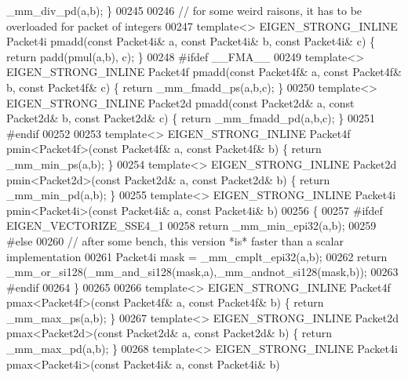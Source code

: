 \begin{DoxyCode}
      \_mm\_div\_pd(a,b); \}
00245 
00246 \textcolor{comment}{// for some weird raisons, it has to be overloaded for packet of integers}
00247 \textcolor{keyword}{template}<> EIGEN\_STRONG\_INLINE Packet4i pmadd(\textcolor{keyword}{const} Packet4i& a, \textcolor{keyword}{const} Packet4i& b, \textcolor{keyword}{const} Packet4i& c) \{ \textcolor{keywordflow}{
      return} padd(pmul(a,b), c); \}
00248 \textcolor{preprocessor}{#ifdef \_\_FMA\_\_}
00249 \textcolor{keyword}{template}<> EIGEN\_STRONG\_INLINE Packet4f pmadd(\textcolor{keyword}{const} Packet4f& a, \textcolor{keyword}{const} Packet4f& b, \textcolor{keyword}{const} Packet4f& c) \{ \textcolor{keywordflow}{
      return} \_mm\_fmadd\_ps(a,b,c); \}
00250 \textcolor{keyword}{template}<> EIGEN\_STRONG\_INLINE Packet2d pmadd(\textcolor{keyword}{const} Packet2d& a, \textcolor{keyword}{const} Packet2d& b, \textcolor{keyword}{const} Packet2d& c) \{ \textcolor{keywordflow}{
      return} \_mm\_fmadd\_pd(a,b,c); \}
00251 \textcolor{preprocessor}{#endif}
00252 
00253 \textcolor{keyword}{template}<> EIGEN\_STRONG\_INLINE Packet4f pmin<Packet4f>(\textcolor{keyword}{const} Packet4f& a, \textcolor{keyword}{const} Packet4f& b) \{ \textcolor{keywordflow}{return} 
      \_mm\_min\_ps(a,b); \}
00254 \textcolor{keyword}{template}<> EIGEN\_STRONG\_INLINE Packet2d pmin<Packet2d>(\textcolor{keyword}{const} Packet2d& a, \textcolor{keyword}{const} Packet2d& b) \{ \textcolor{keywordflow}{return} 
      \_mm\_min\_pd(a,b); \}
00255 \textcolor{keyword}{template}<> EIGEN\_STRONG\_INLINE Packet4i pmin<Packet4i>(\textcolor{keyword}{const} Packet4i& a, \textcolor{keyword}{const} Packet4i& b)
00256 \{
00257 \textcolor{preprocessor}{#ifdef EIGEN\_VECTORIZE\_SSE4\_1}
00258   \textcolor{keywordflow}{return} \_mm\_min\_epi32(a,b);
00259 \textcolor{preprocessor}{#else}
00260   \textcolor{comment}{// after some bench, this version *is* faster than a scalar implementation}
00261   Packet4i mask = \_mm\_cmplt\_epi32(a,b);
00262   \textcolor{keywordflow}{return} \_mm\_or\_si128(\_mm\_and\_si128(mask,a),\_mm\_andnot\_si128(mask,b));
00263 \textcolor{preprocessor}{#endif}
00264 \}
00265 
00266 \textcolor{keyword}{template}<> EIGEN\_STRONG\_INLINE Packet4f pmax<Packet4f>(\textcolor{keyword}{const} Packet4f& a, \textcolor{keyword}{const} Packet4f& b) \{ \textcolor{keywordflow}{return} 
      \_mm\_max\_ps(a,b); \}
00267 \textcolor{keyword}{template}<> EIGEN\_STRONG\_INLINE Packet2d pmax<Packet2d>(\textcolor{keyword}{const} Packet2d& a, \textcolor{keyword}{const} Packet2d& b) \{ \textcolor{keywordflow}{return} 
      \_mm\_max\_pd(a,b); \}
00268 \textcolor{keyword}{template}<> EIGEN\_STRONG\_INLINE Packet4i pmax<Packet4i>(\textcolor{keyword}{const} Packet4i& a, \textcolor{keyword}{const} Packet4i& b)

\end{DoxyCode}
